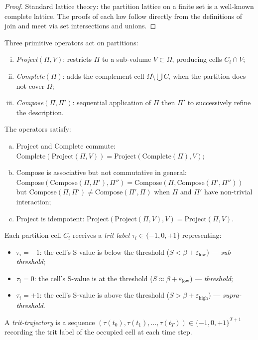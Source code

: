 \begin{proof}
Standard lattice theory: the partition lattice on a finite set is a
well-known complete lattice.  The proofs of each law follow directly from the
definitions of join and meet via set intersections and unions.
\end{proof}

\begin{definition}
\label{def:partition-operators}
Three primitive operators act on partitions:
\begin{enumerate}[(i)]
  \item \emph{Project}$(\Pi, V)$: restricts $\Pi$ to a sub-volume $V \subset \Omega$,
    producing cells $C_i \cap V$;
  \item \emph{Complete}$(\Pi)$: adds the complement cell $\Omega \setminus \bigcup C_i$
    when the partition does not cover $\Omega$;
  \item \emph{Compose}$(\Pi, \Pi')$: sequential application of $\Pi$ then
    $\Pi'$ to successively refine the description.
\end{enumerate}
\end{definition}

\begin{proposition}
\label{prop:op-laws}
The operators satisfy:
\begin{enumerate}[(a)]
  \item Project and Complete commute: $\mathrm{Complete}(\mathrm{Project}(\Pi, V))
    = \mathrm{Project}(\mathrm{Complete}(\Pi), V)$;
  \item Compose is associative but not commutative in general:
    $\mathrm{Compose}(\mathrm{Compose}(\Pi, \Pi'), \Pi'')
    = \mathrm{Compose}(\Pi, \mathrm{Compose}(\Pi', \Pi''))$
    but $\mathrm{Compose}(\Pi, \Pi') \neq \mathrm{Compose}(\Pi', \Pi)$
    when $\Pi$ and $\Pi'$ have non-trivial interaction;
  \item Project is idempotent: $\mathrm{Project}(\mathrm{Project}(\Pi, V), V) =
    \mathrm{Project}(\Pi, V)$.
\end{enumerate}
\end{proposition}

\begin{definition}
\label{def:ternary-encoding}
Each partition cell $C_i$ receives a \emph{trit label} $\tau_i \in \{-1, 0, +1\}$
representing:
\begin{itemize}
  \item $\tau_i = -1$: the cell's S-value is below the threshold
    ($S < \beta + \varepsilon_{\mathrm{low}}$) — \emph{sub-threshold};
  \item $\tau_i = 0$: the cell's S-value is at the threshold
    ($S \approx \beta + \varepsilon_{\mathrm{low}}$) — \emph{threshold};
  \item $\tau_i = +1$: the cell's S-value is above the threshold
    ($S > \beta + \varepsilon_{\mathrm{high}}$) — \emph{supra-threshold}.
\end{itemize}
A \emph{trit-trajectory} is a sequence $(\tau(t_0), \tau(t_1), \ldots,
\tau(t_T)) \in \{-1, 0, +1\}^{T+1}$ recording the trit label of the occupied
cell at each time step.
\end{definition}

